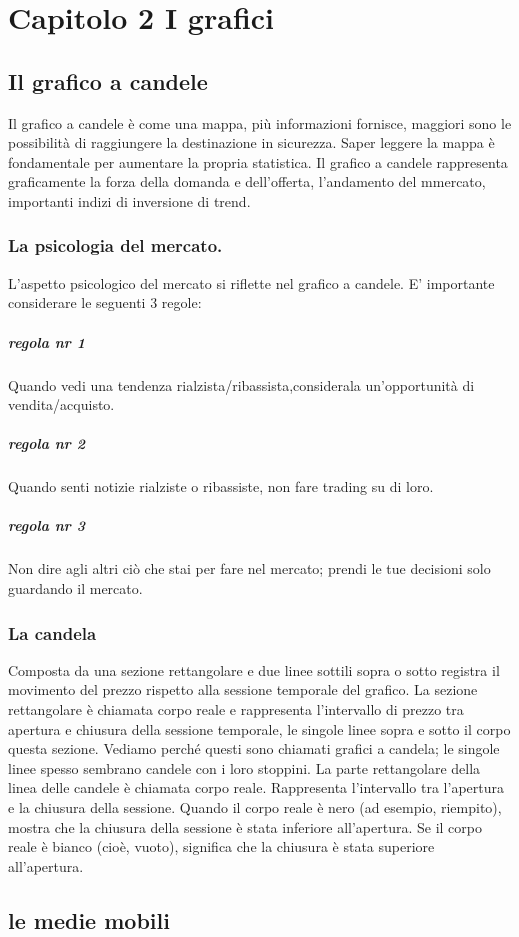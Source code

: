 \chapter{Capitolo 2 I grafici}

\section{Il grafico a candele}
Il grafico a candele è come una mappa, più informazioni fornisce, maggiori sono le possibilità di raggiungere la destinazione in sicurezza.  Saper leggere la mappa è fondamentale per aumentare la propria statistica.
Il grafico a candele rappresenta graficamente la forza della domanda e dell'offerta, l'andamento del mmercato, importanti indizi di inversione di trend.

\subsection{La psicologia del mercato.}
L'aspetto psicologico del mercato si riflette nel grafico a candele.
E' importante considerare le seguenti 3 regole:
\paragraph{regola nr 1}
Quando vedi una tendenza rialzista/ribassista,considerala un'opportunità di vendita/acquisto.
\paragraph{regola nr 2}
Quando senti notizie rialziste o ribassiste, non fare trading su di loro.
\paragraph{regola nr 3}
Non dire agli altri ciò che stai per fare nel mercato; prendi le tue decisioni solo guardando il mercato.

\subsection{La candela}
Composta da una sezione rettangolare e due linee sottili sopra o sotto registra il movimento del prezzo rispetto alla sessione temporale del grafico.
La sezione rettangolare è chiamata corpo reale e rappresenta l'intervallo di prezzo tra apertura e chiusura della sessione temporale, le singole linee sopra e sotto il corpo questa
sezione. Vediamo perché questi sono chiamati grafici a candela; le singole
linee spesso sembrano candele con i loro stoppini. La parte rettangolare della
linea delle candele è chiamata corpo reale. Rappresenta l'intervallo tra
l'apertura e la chiusura della sessione. Quando il corpo reale è nero (ad esempio, riempito),
mostra che la chiusura della sessione è stata inferiore all'apertura. Se il corpo reale è bianco (cioè, vuoto), significa che la chiusura è stata superiore all'apertura.
 
\section{le medie mobili}